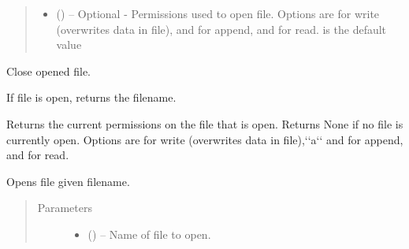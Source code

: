 \documentclass[a4paper,10pt,openany,english]{sphinxmanual}
\begin{document}
\begin{fulllineitems}
\begin{quote}
\begin{description}
\begin{itemize}
\item {} 
 () -- Optional -
Permissions used to open file. Options are  for write (overwrites data in file),
 and  for append, and  for read.  is the default value

\end{itemize}

\end{description}\end{quote}

\begin{fulllineitems}
\label{egadsapi:egads.input.input_core.FileCore.close}
Close opened file.

\end{fulllineitems}


\begin{fulllineitems}
\label{egadsapi:egads.input.input_core.FileCore.get_filename}
If file is open, returns the filename.

\end{fulllineitems}


\begin{fulllineitems}
\label{egadsapi:egads.input.input_core.FileCore.get_perms}
Returns the current permissions on the file that is open. Returns None if
no file is currently open. Options are  for write (overwrites
data in file),{}`{}`a{}`{}` and  for append, and  for read.

\end{fulllineitems}


\begin{fulllineitems}
\label{egadsapi:egads.input.input_core.FileCore.open}
Opens file given filename.
\begin{quote}\begin{description}
\item[{Parameters}] \leavevmode\begin{itemize}
\item {} 
 () -- Name of file to open.


\end{itemize}
\end{description}
\end{quote}
\end{fulllineitems}
\end{fulllineitems}
\end{document}
